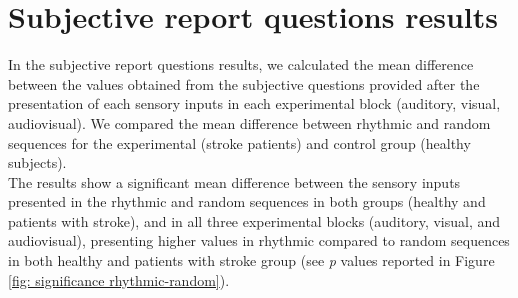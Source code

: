 \section{Subjective report questions results}
In the subjective report questions results, we calculated the mean difference between the values obtained from the subjective questions provided after the presentation of each sensory inputs in each experimental block (auditory, visual, audiovisual). We compared the mean difference between rhythmic and random sequences for the experimental (stroke patients) and control group (healthy subjects). \\
The results show a significant mean difference between the sensory inputs presented in the rhythmic and random sequences in both groups (healthy and patients with stroke), and in all three experimental blocks (auditory, visual, and audiovisual), presenting higher values in rhythmic compared to random sequences in both healthy and patients with stroke group (see \textit{p} values reported in Figure \ref{fig: significance rhythmic-random}).
